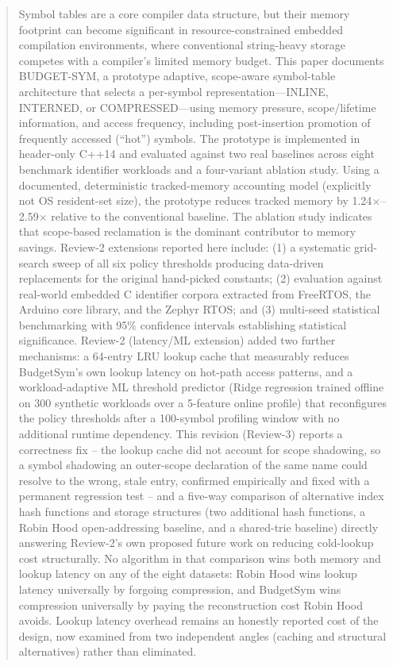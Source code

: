 \documentclass[conference]{IEEEtran}
\begin{document}
\begin{abstract}
Symbol tables are a core compiler data structure, but their memory footprint
can become significant in resource-constrained embedded compilation
environments, where conventional string-heavy storage competes with a
compiler's limited memory budget. This paper documents BUDGET-SYM, a
prototype adaptive, scope-aware symbol-table architecture that selects a
per-symbol representation---INLINE, INTERNED, or COMPRESSED---using memory
pressure, scope/lifetime information, and access frequency, including
post-insertion promotion of frequently accessed (``hot'') symbols. The
prototype is implemented in header-only C++14 and evaluated against two real
baselines across eight benchmark identifier workloads and a four-variant
ablation study. Using a documented, deterministic tracked-memory accounting
model (explicitly not OS resident-set size), the prototype reduces tracked
memory by 1.24$\times$--2.59$\times$ relative to the conventional baseline.
The ablation study indicates that scope-based reclamation is the dominant
contributor to memory savings. Review-2 extensions reported here include:
(1) a systematic grid-search sweep of all six policy thresholds producing
data-driven replacements for the original hand-picked constants; (2)
evaluation against real-world embedded C identifier corpora extracted from
FreeRTOS, the Arduino core library, and the Zephyr RTOS; and (3) multi-seed
statistical benchmarking with 95\% confidence intervals establishing
statistical significance. Review-2 (latency/ML extension) added two further
mechanisms: a 64-entry LRU lookup cache that measurably reduces BudgetSym's
own lookup latency on hot-path access patterns, and a workload-adaptive ML
threshold predictor (Ridge regression trained offline on 300 synthetic
workloads over a 5-feature online profile) that reconfigures the policy
thresholds after a 100-symbol profiling window with no additional runtime
dependency. This revision (Review-3) reports a correctness fix -- the
lookup cache did not account for scope shadowing, so a symbol shadowing an
outer-scope declaration of the same name could resolve to the wrong, stale
entry, confirmed empirically and fixed with a permanent regression test --
and a five-way comparison of alternative index hash functions and storage
structures (two additional hash functions, a Robin Hood open-addressing
baseline, and a shared-trie baseline) directly answering Review-2's own
proposed future work on reducing cold-lookup cost structurally. No
algorithm in that comparison wins both memory and lookup latency on any of
the eight datasets: Robin Hood wins lookup latency universally by forgoing
compression, and BudgetSym wins compression universally by paying the
reconstruction cost Robin Hood avoids. Lookup latency overhead remains an
honestly reported cost of the design, now examined from two independent
angles (caching and structural alternatives) rather than eliminated.
\end{abstract}
\end{document}
